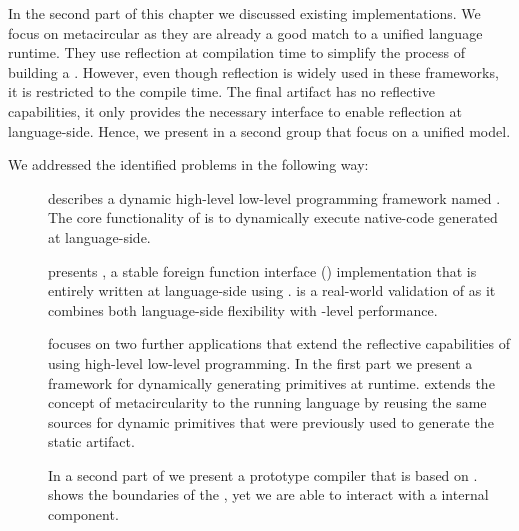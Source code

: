 In the second part of this chapter we discussed existing \VM implementations.
We focus on metacircular \VMs as they are already a good match to a unified language runtime.
They use reflection at compilation time to simplify the process of building a \VM.
However, even though reflection is widely used in these frameworks, it is restricted to the compile time.
The final \VM artifact has no reflective capabilities, it only provides the necessary interface to enable reflection at language-side.
Hence, we present in a second group \VMs that focus on a unified model.


We addressed the identified problems in the following way:
\begin{description}	
	
	\item[] describes a dynamic high-level low-level programming framework named \B.
	The core functionality of \B is to dynamically execute native-code generated at language-side.
		
	\item[] presents \NB, a stable foreign function interface (\FFI) implementation that is entirely written at language-side using \B.
	\NB is a real-world validation of \B as it combines both language-side flexibility with \VM-level performance.
	
	\item[] focuses on two further \B applications that extend the reflective capabilities of \PH using high-level low-level programming.
	In the first part we present \WF a framework for dynamically generating primitives at runtime.
	\WF extends the concept of metacircularity to the running language by reusing the same sources for dynamic primitives that were previously used to generate the static \VM artifact.
		
	In a second part of  we present \NBJ a prototype \JIT compiler that is based on \B.
	\NBJ shows the boundaries of the \B, yet we are able to interact with a \VM internal component.
\end{description}


